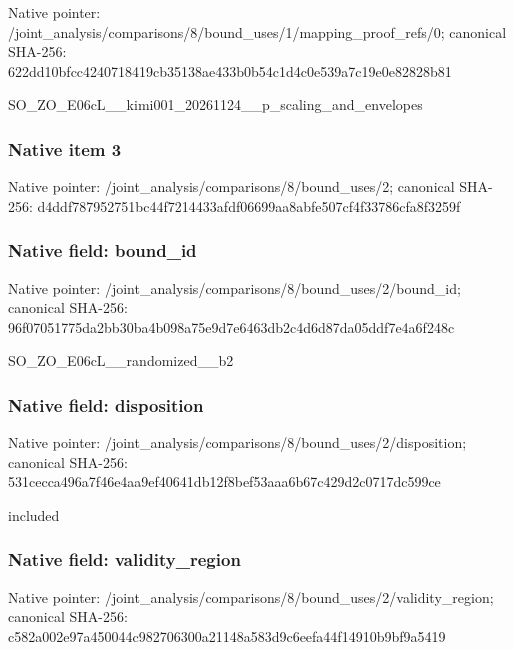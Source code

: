 \documentclass[10pt,a4paper]{article}
\begin{document}
Native pointer: /joint\_analysis/comparis\allowbreak{}ons/8/bound\_uses/1/mappi\allowbreak{}ng\_proof\_refs/0; canonical SHA-256: 622dd10bfcc4240718419cb3\allowbreak{}5138ae433b0b54c1d4c0e539\allowbreak{}a7c19e0e82828b81


SO\_ZO\_E06cL\_\_kimi001\_202\allowbreak{}61124\_\_p\_scaling\_and\_env\allowbreak{}elopes


\subsubsection{Native item 3}


Native pointer: /joint\_analysis/comparis\allowbreak{}ons/8/bound\_uses/2; canonical SHA-256: d4ddf787952751bc44f72144\allowbreak{}33afdf06699aa8abfe507cf4\allowbreak{}f33786cfa8f3259f



\subsubsection{Native field: bound\_id}


Native pointer: /joint\_analysis/comparis\allowbreak{}ons/8/bound\_uses/2/bound\allowbreak{}\_id; canonical SHA-256: 96f07051775da2bb30ba4b09\allowbreak{}8a75e9d7e6463db2c4d6d87d\allowbreak{}a05ddf7e4a6f248c


SO\_ZO\_E06cL\_\_randomized\_\_b2


\subsubsection{Native field: disposition}


Native pointer: /joint\_analysis/comparis\allowbreak{}ons/8/bound\_uses/2/dispo\allowbreak{}sition; canonical SHA-256: 531cecca496a7f46e4aa9ef4\allowbreak{}0641db12f8bef53aaa6b67c4\allowbreak{}29d2c0717dc599ce


included


\subsubsection{Native field: validity\_region}


Native pointer: /joint\_analysis/comparis\allowbreak{}ons/8/bound\_uses/2/valid\allowbreak{}ity\_region; canonical SHA-256: c582a002e97a450044c98270\allowbreak{}6300a21148a583d9c6eefa44\allowbreak{}f14910b9bf9a5419
\end{document}
